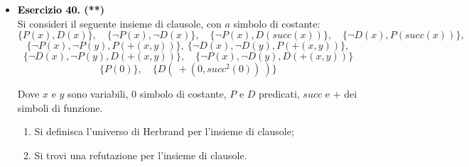 \documentclass[a4paper,10pt]{article}
\begin{document}
{\begin{itemize}[label=, leftmargin=0pt]
\begin{osservazioni}
    Possiamo ora sfruttare la conoscenza ricavata intorno a  $$<(0,succ^3(0)) \rightarrow \bigg( \lnot P(0) \lor \lnot P(succ^3(0))\bigg)$$ precedentemente trattata, per ottenere come prima grazie alla clausola $\{<(0,succ^3(0))\}$, la nuova clausola $$\{\lnot P(0), \lnot P(succ^3(0))\}$$

    Ecco che, utilizzando l'insieme di conoscenza a priori $S$ e 

    $$S|_{H'}= \{<(0,succ(0)\},
    \ \{<(succ(0),succ^2(0)\},
    \ \{<(succ^2(0),succ^3(0)\},
    \ \{<(0,succ^3(0)\},
    \ \{\lnot P(0), \lnot P(succ^3(0))\}$$\\
    Possiamo da $S\cup S|_{H'}=$ 
    
    $$\{<(x,succ(x)\},\ \{\lnot<(x,y),\ \lnot <(y,z), <(x,z)\},\ \{\lnot P(x),\ \lnot <(x,y),\lnot P(y)\},\ \{P(0)\},
    \ \{P(succ^3(0))\},$$
    $$
    \{<(0,succ(0)\},
    \ \{<(succ(0),succ^2(0)\},
    \ \{<(succ^2(0),succ^3(0)\},
    \ \{<(0,succ^3(0)\},
    \ \{\lnot P(0), \lnot P(succ^3(0))\}$$\\
    ottenere tramite risolventi secondo DP o DPLL:
    
    $$\{\lnot P(0), \lnot P(succ^3(0))\},\ \{P(0)\}\overset{R}{\Rightarrow} \{\lnot P(succ^3(0))\}$$\\
    Che, insieme alla clausola $\{P(succ^3(0))\}$ presente originariamente in $S$ dà luogo a una contraddizione.

    
    \end{osservazioni}

    \item \textbf{\textcolor{black}{Esercizio 40.} (**)} \\ 	
    Si consideri il seguente insieme di clausole, con $a$ simbolo di costante:
    $$\{P(x), D(x)\},\quad \{\lnot P(x), \lnot D(x)\},\quad \{\lnot P(x), D(succ(x))\},\quad \{\lnot D(x), P(succ(x))\},$$
    $$\{\lnot P(x), \lnot P(y), P(+(x, y))\},\ \{\lnot D(x), \lnot D(y), P(+(x, y))\},$$
    $$\{\lnot D(x), \lnot P(y), D(+(x, y))\},\quad \{\lnot P(x), \lnot D(y), D(+(x, y))\}$$
    $$\{P(0)\},\quad \{D(\ +(0, succ^2(0))\ )\}$$

    Dove $x$ e $y$ sono variabili, $0$ simbolo di costante, $P$ e $D$ predicati, $succ$ e $+$ dei simboli di funzione.
    \begin{enumerate}
        \item Si definisca l'universo di Herbrand per l'insieme di clausole;
        \item Si trovi una refutazione per l'insieme di clausole.
    \end{enumerate}
    

\end{itemize}}
\end{document}
